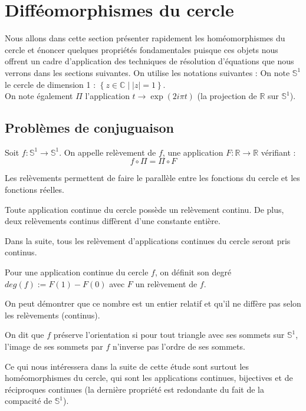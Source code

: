 \documentclass[11pt,a4paper]{article}
\begin{document}
\section{Difféomorphismes du cercle}
Nous allons dans cette section présenter rapidement les homéomorphismes du cercle et énoncer quelques propriétés fondamentales puisque ces objets nous offrent un cadre d'application des techniques de résolution d'équations que nous verrons dans les sections suivantes. On utilise les notations suivantes :
On note $\mathbb{S}^1$ le cercle de dimension 1 : $\left\{ z \in \mathbb{C} \mid |z|=1 \right\}$.
\\
On note également $\Pi$ l'application $ t \to \exp (2i\pi t) $ (la projection de $\mathbb{R}$ sur $\mathbb{S}^1$).
\subsection{Problèmes de conjuguaison}
\begin{defin}
Soit $f :\mathbb{S}^1 \to \mathbb{S}^1$. On appelle relèvement de $f$, une application $F :  \mathbb{R} \to \mathbb{R}$ vérifiant :
\begin{equation*}
f \circ \Pi = \Pi \circ F
\end{equation*}
\end{defin}
\begin{rmq}
Les relèvements permettent de faire le parallèle entre les fonctions du cercle et les fonctions réelles.
\end{rmq}
\begin{thm}
Toute application continue du cercle possède un relèvement continu. De plus, deux relèvements continus diffèrent d'une constante entière.
\end{thm}
Dans la suite, tous les relèvement d'applications continues du cercle seront pris continus.
\begin{defin}
Pour une application continue du cercle $f$, on définit son degré $deg(f) := F(1)-F(0)$ avec $F$ un relèvement de $f$.
\end{defin}
\begin{rmq}
On peut démontrer que ce nombre est un entier relatif et qu'il ne diffère pas selon les relèvements (continus).
\end{rmq}
\begin{defin}
On dit que $f$ préserve l'orientation si pour tout triangle avec ses sommets sur $\mathbb{S}^1$, l'image de ses sommets par $f$ n'inverse pas l'ordre de ses sommets.
\end{defin}
Ce qui nous intéressera dans la suite de cette étude sont surtout les homéomorphismes du cercle, qui sont les applications continues, bijectives et de réciproques continues (la dernière propriété est redondante du fait de la compacité de $\mathbb{S}^1$).
\end{document}
